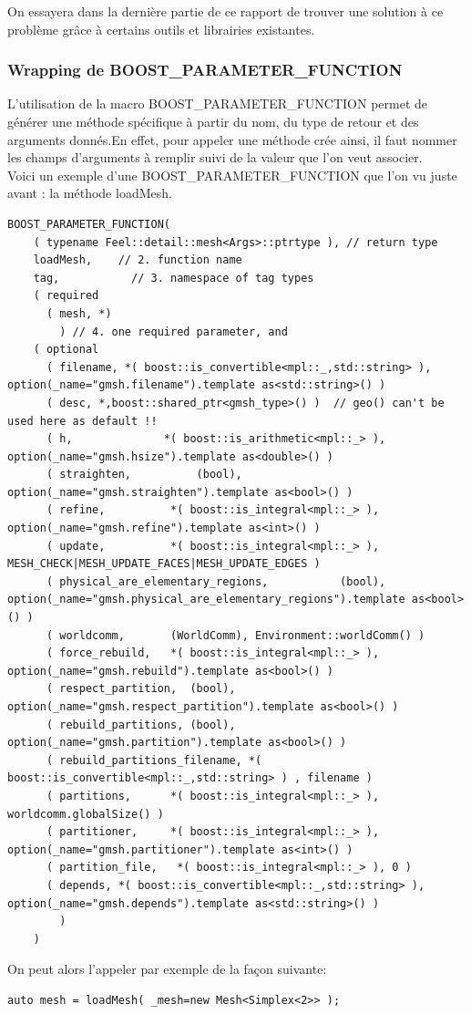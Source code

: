 \documentclass[french,12pt]{article}
\begin{document}
On essayera dans la dernière partie de ce rapport de trouver une solution à ce problème grâce à certains outils et librairies existantes.

\subsubsection{Wrapping de BOOST\_PARAMETER\_FUNCTION}

L'utilisation de la macro BOOST\_PARAMETER\_FUNCTION permet de générer une méthode spécifique à partir du nom, du type de retour et des arguments donnés.En effet, pour appeler une méthode crée ainsi, il faut nommer les champs d'arguments à remplir suivi de la valeur que l'on veut associer.\\
Voici un exemple d'une BOOST\_PARAMETER\_FUNCTION que l'on vu juste avant : la méthode loadMesh.

\begin{lstlisting}
BOOST_PARAMETER_FUNCTION(
    ( typename Feel::detail::mesh<Args>::ptrtype ), // return type
    loadMesh,    // 2. function name
    tag,           // 3. namespace of tag types
    ( required
      ( mesh, *)
        ) // 4. one required parameter, and
    ( optional
      ( filename, *( boost::is_convertible<mpl::_,std::string> ), option(_name="gmsh.filename").template as<std::string>() )
      ( desc, *,boost::shared_ptr<gmsh_type>() )  // geo() can't be used here as default !!
      ( h,              *( boost::is_arithmetic<mpl::_> ), option(_name="gmsh.hsize").template as<double>() )
      ( straighten,          (bool), option(_name="gmsh.straighten").template as<bool>() )
      ( refine,          *( boost::is_integral<mpl::_> ), option(_name="gmsh.refine").template as<int>() )
      ( update,          *( boost::is_integral<mpl::_> ), MESH_CHECK|MESH_UPDATE_FACES|MESH_UPDATE_EDGES )
      ( physical_are_elementary_regions,		   (bool), option(_name="gmsh.physical_are_elementary_regions").template as<bool>() )
      ( worldcomm,       (WorldComm), Environment::worldComm() )
      ( force_rebuild,   *( boost::is_integral<mpl::_> ), option(_name="gmsh.rebuild").template as<bool>() )
      ( respect_partition,	(bool), option(_name="gmsh.respect_partition").template as<bool>() )
      ( rebuild_partitions,	(bool), option(_name="gmsh.partition").template as<bool>() )
      ( rebuild_partitions_filename, *( boost::is_convertible<mpl::_,std::string> )	, filename )
      ( partitions,      *( boost::is_integral<mpl::_> ), worldcomm.globalSize() )
      ( partitioner,     *( boost::is_integral<mpl::_> ), option(_name="gmsh.partitioner").template as<int>() )
      ( partition_file,   *( boost::is_integral<mpl::_> ), 0 )
      ( depends, *( boost::is_convertible<mpl::_,std::string> ), option(_name="gmsh.depends").template as<std::string>() )
        )
    )
\end{lstlisting}
On peut alors l'appeler par exemple de la façon suivante:
\begin{lstlisting}
auto mesh = loadMesh( _mesh=new Mesh<Simplex<2>> );
\end{lstlisting}
\end{document}
